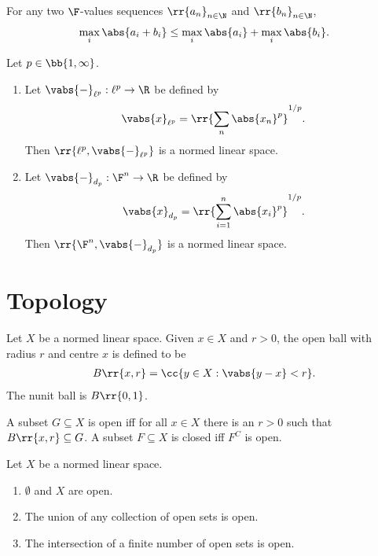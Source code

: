 \documentclass{article}
\begin{document}
\begin{theorem}
  \label{thm:minkowski-for-p-infinite}
  For any two $\F$-values sequences $ \rr{a_n}_{n\in\N}$ and $ \rr{b_n}_{n\in\N}$,
  \begin{align*}
    \max_i \abs{a_i + b_i} \leq \max_i \abs{a_i} + \max_i \abs{b_i}.
  \end{align*}
\end{theorem}

\begin{theorem}
  \label{thm:dl-norms}
  Let $p\in \bb{1,\infty}$.
  \begin{enumerate}
    \item Let $ \vabs{-}_{\ell^p} : \ell^p \to \R$ be defined by \begin{align*}
        \vabs{x}_{\ell^p} = \rr{\sum_{n}^{} \abs{x_n}^p}^{1/p}.
      \end{align*}
      Then $ \rr{\ell^p, \vabs{-}_{\ell^p}}$ is a normed linear space.
    \item Let $ \vabs{-}_{d_p} : \F^n \to \R$ be defined by \begin{align*}
        \vabs{x}_{d_p} = \rr{\sum_{i=1}^{n} \abs{x_i}^p}^{1/p}.
      \end{align*}
      Then $ \rr{\F^n, \vabs{-}_{d_p}} $ is a normed linear space.
  \end{enumerate}
\end{theorem}

\section{Topology} \label{sec:topology}

\begin{definition}
  \label{def:open}
  Let $X$ be a normed linear space. Given $x\in X$ and $r>0$, the open ball with radius
  $r$ and centre $x$ is defined to be
  \begin{align*}
    B\rr{x,r}=\cc{y\in X:\vabs{y-x}<r}.
  \end{align*}
  The nunit ball is $B\rr{0,1}$.

  A subset $G\subseteq X$ is open iff for all $x\in X$ there is an $r>0$ such that
  $B\rr{x,r}\subseteq G$. A subset $F\subseteq X$ is closed iff $F^C$ is open.
\end{definition}

\begin{theorem}
  Let $X$ be a normed linear space.
  \begin{enumerate}
    \item $\emptyset$ and $X$ are open.
    \item The union of any collection of open sets is open.
    \item The intersection of a finite number of open sets is open.
  \end{enumerate}
\end{theorem}
\end{document}
